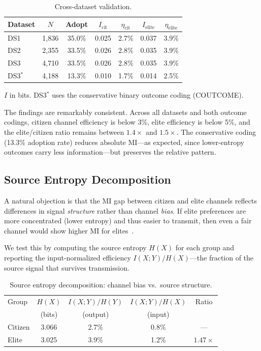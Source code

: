 \documentclass[twocolumn,10pt]{article}
\begin{document}
\begin{table}[t]
\centering
\caption{Cross-dataset validation.}
\label{tab:crossval}
\begin{tabular}{@{}lcccccc@{}}
\toprule
Dataset & $N$ & Adopt & $I_\text{cit}$ & $\eta_\text{cit}$ & $I_\text{elite}$ & $\eta_\text{elite}$ \\
\midrule
DS1 & 1,836 & 35.0\% & 0.025 & 2.7\% & 0.037 & 3.9\% \\
DS2 & 2,355 & 33.5\% & 0.026 & 2.8\% & 0.035 & 3.9\% \\
DS3 & 4,710 & 33.5\% & 0.026 & 2.8\% & 0.035 & 3.9\% \\
DS3$^*$ & 4,188 & 13.3\% & 0.010 & 1.7\% & 0.014 & 2.5\% \\
\bottomrule
\end{tabular}
\smallskip

\footnotesize{$I$ in bits.  DS3$^*$ uses the conservative binary outcome coding (COUTCOME).}
\end{table}

The findings are remarkably consistent.  Across all datasets and both outcome codings, citizen channel efficiency is below 3\%, elite efficiency is below 5\%, and the elite/citizen ratio remains between $1.4\times$ and $1.5\times$.  The conservative coding (13.3\% adoption rate) reduces absolute MI---as expected, since lower-entropy outcomes carry less information---but preserves the relative pattern.

\subsection{Source Entropy Decomposition}

A natural objection is that the MI gap between citizen and elite channels reflects differences in signal \emph{structure} rather than channel \emph{bias}.  If elite preferences are more concentrated (lower entropy) and thus easier to transmit, then even a fair channel would show higher MI for elites~\citep{cover2006}.

We test this by computing the source entropy $H(X)$ for each group and reporting the input-normalized efficiency $I(X;Y)/H(X)$---the fraction of the source signal that survives transmission.

\begin{table}[t]
\centering
\caption{Source entropy decomposition: channel bias vs.\ source structure.}
\label{tab:source}
\begin{tabular}{@{}lcccc@{}}
\toprule
Group & $H(X)$ & $I(X;Y)/H(Y)$ & $I(X;Y)/H(X)$ & Ratio \\
 & (bits) & (output) & (input) & \\
\midrule
Citizen & 3.066 & 2.7\% & 0.8\% & --- \\
Elite & 3.025 & 3.9\% & 1.2\% & $1.47\times$ \\
\bottomrule
\end{tabular}
\end{table}
\end{document}
